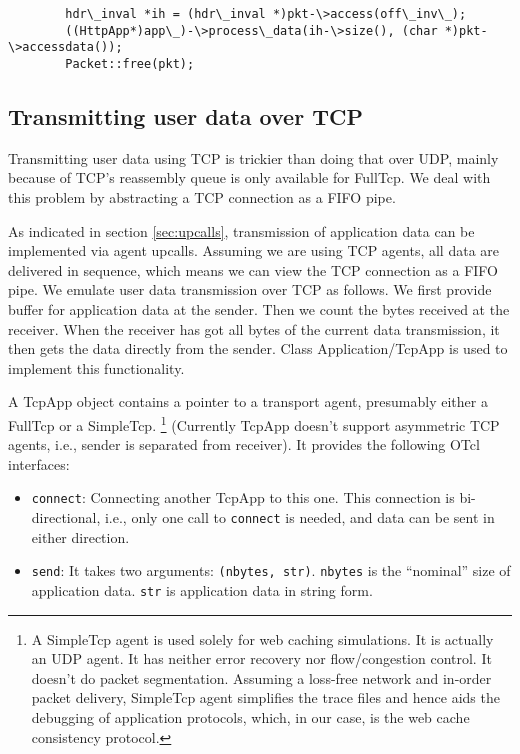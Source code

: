 \begin{verbatim}
        hdr\_inval *ih = (hdr\_inval *)pkt-\>access(off\_inv\_);
        ((HttpApp*)app\_)-\>process\_data(ih-\>size(), (char *)pkt-\>accessdata());
        Packet::free(pkt);
\end{verbatim}


\subsection{Transmitting user data over TCP}
\label{sec:webcache-tcpapp}

Transmitting user data using TCP is trickier than doing that over UDP,
mainly because of TCP's reassembly queue is only available for
FullTcp. We deal with this problem by abstracting a TCP connection as
a FIFO pipe. 

As indicated in section \ref{sec:upcalls}, transmission of application data
can be implemented via agent upcalls. Assuming we are using TCP agents, 
all data are delivered in sequence, which means we can view the TCP 
connection as a FIFO pipe. We emulate user data transmission over TCP
as follows. We first provide buffer 
for application data at the sender. Then we count the bytes received at the 
receiver. When the receiver has got all bytes of the current data transmission,
it then gets the data directly from the sender. Class Application/TcpApp is 
used to implement this functionality.

A TcpApp object contains a pointer to a transport agent, presumably either
a FullTcp or a SimpleTcp.
\footnote{A SimpleTcp agent is used solely for web caching simulations. It 
is actually an UDP agent. It has neither error recovery nor flow/congestion
control. It doesn't do packet segmentation. Assuming a loss-free network 
and in-order packet delivery,
SimpleTcp agent simplifies the trace files 
and hence aids the debugging of application protocols, which, in our case, 
is the web cache consistency protocol.}
(Currently TcpApp doesn't support asymmetric TCP agents, i.e., sender is
separated from receiver). It provides the following OTcl interfaces:

\begin{itemize}
\item {\tt connect}: Connecting another TcpApp to this one. This
  connection is bi-directional, i.e., only one call to {\tt connect} is 
  needed, and data can be sent in either direction. 
\item {\tt send}: It takes two arguments: {\tt (nbytes, str)}.
  {\tt nbytes} is the ``nominal'' size of application data. {\tt str} 
  is application data in string form.
\end{itemize}

